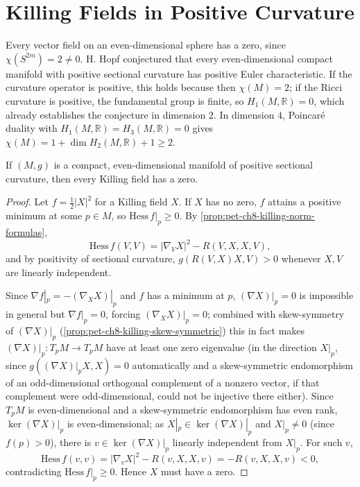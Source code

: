 \section{Killing Fields in Positive Curvature}

\begin{remark}
  \label{rem:pet-ch8-hopf-conjecture-low-dimensions}
  Every vector field on an even-dimensional sphere has a zero, since
  $\chi(S^{2m})=2\ne0$. H. Hopf conjectured that every even-dimensional compact
  manifold with positive sectional curvature has positive Euler characteristic.
  If the curvature operator is positive, this holds because then
  $\chi(M)=2$; if the Ricci curvature is positive, the fundamental group is
  finite, so $H_1(M,\mathbb{R})=0$, which already establishes the conjecture in
  dimension $2$. In dimension $4$, Poincar\'e duality with $H_1(M,\mathbb{R})=H_3(M,\mathbb{R})=0$
  gives $\chi(M)=1+\dim H_2(M,\mathbb{R})+1\ge2$.
\end{remark}

\begin{theorem}
  \label{thm:pet-ch8-berger-killing-field-zero}
  If $(M,g)$ is a compact, even-dimensional manifold of positive sectional
  curvature, then every Killing field has a zero.
\end{theorem}
\begin{proof}
  Let $f=\tfrac12|X|^2$ for a Killing field $X$. If $X$ has no zero, $f$
  attains a positive minimum at some $p\in M$, so $\mathrm{Hess}\,f|_p\ge0$. By
  \cref{prop:pet-ch8-killing-norm-formulas},
  \[
    \mathrm{Hess}\,f(V,V)=|\nabla_VX|^2-R(V,X,X,V),
  \]
  and by positivity of sectional curvature, $g(R(V,X)X,V)>0$ whenever $X,V$ are
  linearly independent.

  Since $\nabla f|_p=-(\nabla_XX)|_p$ and $f$ has a minimum at $p$,
  $(\nabla X)|_p=0$ is impossible in general but $\nabla f|_p=0$, forcing
  $(\nabla_XX)|_p=0$; combined with skew-symmetry of $(\nabla X)|_p$
  (\cref{prop:pet-ch8-killing-skew-symmetric}) this in fact makes
  $(\nabla X)|_p:T_pM\to T_pM$ have at least one zero eigenvalue (in the
  direction $X|_p$, since $g((\nabla X)|_pX,X)=0$ automatically and a
  skew-symmetric endomorphism of an odd-dimensional orthogonal complement of a
  nonzero vector, if that complement were odd-dimensional, could not be
  injective there either). Since $T_pM$ is even-dimensional and a
  skew-symmetric endomorphism has even rank, $\ker(\nabla X)|_p$ is
  even-dimensional; as $X|_p\in\ker(\nabla X)|_p$ and $X|_p\ne0$ (since $f(p)>0$),
  there is $v\in\ker(\nabla X)|_p$ linearly independent from $X|_p$. For such
  $v$,
  \[
    \mathrm{Hess}\,f(v,v)=|\nabla_vX|^2-R(v,X,X,v)=-R(v,X,X,v)<0,
  \]
  contradicting $\mathrm{Hess}\,f|_p\ge0$. Hence $X$ must have a zero.
\end{proof}

